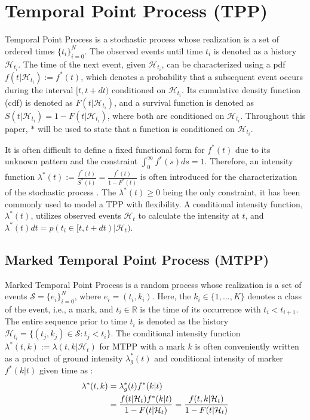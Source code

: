 \section{Temporal Point Process (TPP)}
Temporal Point Process is a stochastic process whose realization is a set of ordered times $\{t_i\}_{i=0}^N$.
The observed events until time $t_i$ is denoted as a history $\mathcal{H}_{t_i}$. 
The time of the next event, given $\mathcal{H}_{t_i}$, can be characterized using a pdf $f(t|\mathcal{H}_{t_i}) := f^*(t)$, which denotes a probability that a subsequent event occurs during the interval $[t, t+dt)$ conditioned on $\mathcal{H}_{t_i}$. 
Its cumulative density function (cdf) is denoted as $F(t|\mathcal{H}_{t_i})$, and a survival function is denoted as $S(t|\mathcal{H}_{t_i}) = 1-F(t|\mathcal{H}_{t_i})$, where both are conditioned on $\mathcal{H}_{t_i}$.
Throughout this paper, $*$ will be used to state that a function is conditioned on $\mathcal{H}_{t_i}$.

It is often difficult to define a fixed functional form for $f^*(t)$ due to its unknown pattern and the constraint $\int _0 ^\infty f^*(s) ds = 1$.
Therefore, an intensity function 
$\lambda^*(t):= \frac{f^*(t)}{S^*(t)} = \frac{f^*(t)}{1-F^*(t)}$
is often introduced for the characterization of the stochastic process  \cite{lec:tpp}. 
The $\lambda^*(t) \geq 0$ being the only constraint, it has been commonly used to model a TPP with flexibility\cite{bib:hawkesOrigin, bib:nhp, bib:fully_neural, bib:NJSDE, bib:sahp, bib:THP, bib:STPP, bib:ANHP}.
A conditional intensity function, $\lambda^*(t)$, utilizes observed events $\mathcal{H}_{t}$ to calculate the intensity at $t$, and $\lambda ^ * (t) dt = p(t_{i} \in [t, t+dt) | \mathcal{H}_{t})$.

\subsection{Marked Temporal Point Process (MTPP)}
Marked Temporal Point Process is a random process whose realization is a set of events $\mathcal{S} = \{e_i\}_{i = 0}^N$, where $e_i = (t_i, k_i)$. Here, the $k_i \in \{1, \ldots, K\}$ denotes a class of the event, i.e., a mark, and $t_i \in \mathbb{R}$ is the time of its occurrence with $t_i < t_{i+1}$. The entire sequence prior to time $t_i$ is denoted as the history $\mathcal{H}_{t_i} = \{(t_j, k_j) \in \mathcal{S} : t_j < t_i\}$. 
The conditional intensity function $\lambda^*(t, k) := \lambda(t, k | \mathcal{H}_{t})$ for MTPP with a mark $k$ is often conveniently written as a product of ground intensity
$\lambda_g ^* (t)$ and conditional intensity of marker $f ^*(k|t)$ given time as \cite{lec:tpp, lec:tpp_Rodriguez, bib:daley}: 
\begin{equation}
\begin{aligned}
    \lambda ^* (t,k) &= \lambda_g ^* (t) f ^*(k|t) \\
    &= {{f(t| \mathcal{H}_{t})f^*(k|t)} \over {1 - F(t | \mathcal{H}_{t})}} 
    = {{f(t, k| \mathcal{H}_{t})} \over {1 - F(t | \mathcal{H}_{t})}}
\end{aligned}
\end{equation}

